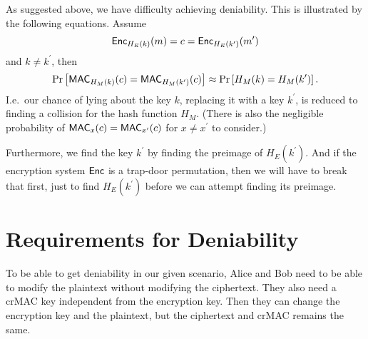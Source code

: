 As suggested above, we have difficulty achieving deniability.
This is illustrated by the following equations.
Assume
\begin{equation*}
  \operatorname{\mathsf{Enc}}_{H_E(k)}( m ) = c = \operatorname{\mathsf{Enc}}_{H_E(k^\prime)}( m^\prime )
\end{equation*}
and \(k\neq k^\prime\), then
\begin{equation*}
  \Pr\left[
    \operatorname{\mathsf{MAC}}_{H_M(k)}( c ) = \operatorname{\mathsf{MAC}}_{H_M(k^\prime)}( c )
  \right]
  \approx
  \Pr\left[ H_M(k) = H_M(k^\prime) \right].
\end{equation*}
I.e.~our chance of lying about the key \(k\), replacing it with a key 
\(k^\prime\), is reduced to finding a collision for the hash function \(H_M\).
(There is also the negligible probability of \(\operatorname{\mathsf{MAC}}_x(c) = \operatorname{\mathsf{MAC}}_{x^\prime}(c)\) 
for \(x\neq x^\prime\) to consider.)

Furthermore, we find the key \(k^\prime\) by finding the preimage of \(H_E( 
k^\prime )\).
And if the encryption system \(\operatorname{\mathsf{Enc}}\) is a trap-door permutation, then we will 
have to break that first, just to find \(H_E( k^\prime )\) before we can 
attempt finding its preimage.


\section{Requirements for Deniability}
\label{sec:deniability}

To be able to get deniability in our given scenario, Alice and Bob need to be 
able to modify the plaintext without modifying the ciphertext.
They also need a \ac{crMAC} key independent from the encryption key.
Then they can change the encryption key and the plaintext, but the ciphertext 
and \ac{crMAC} remains the same.

